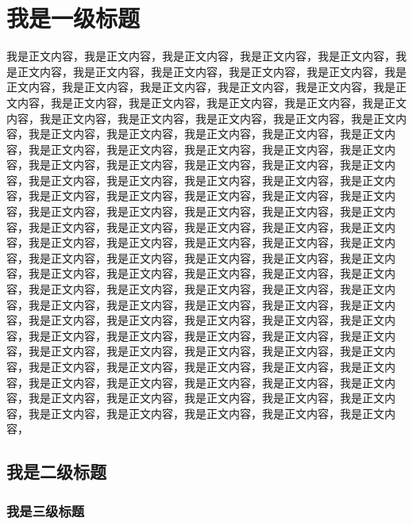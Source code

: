 \chapter{我是一级标题}
我是正文内容，我是正文内容，我是正文内容，我是正文内容，我是正文内容，我是正文内容，我是正文内容，我是正文内容，我是正文内容，我是正文内容，我是正文内容，我是正文内容，我是正文内容，我是正文内容，我是正文内容，我是正文内容，我是正文内容，我是正文内容，我是正文内容，我是正文内容，我是正文内容，我是正文内容，我是正文内容，我是正文内容，我是正文内容，我是正文内容，我是正文内容，我是正文内容，我是正文内容，我是正文内容，我是正文内容，我是正文内容，我是正文内容，我是正文内容，我是正文内容，我是正文内容，我是正文内容，我是正文内容，我是正文内容，我是正文内容，我是正文内容，我是正文内容，我是正文内容，我是正文内容，我是正文内容，我是正文内容，我是正文内容，我是正文内容，我是正文内容，我是正文内容，我是正文内容，我是正文内容，我是正文内容，我是正文内容，我是正文内容，我是正文内容，我是正文内容，我是正文内容，我是正文内容，我是正文内容，我是正文内容，我是正文内容，我是正文内容，我是正文内容，我是正文内容，我是正文内容，我是正文内容，我是正文内容，我是正文内容，我是正文内容，我是正文内容，我是正文内容，我是正文内容，我是正文内容，我是正文内容，我是正文内容，我是正文内容，我是正文内容，我是正文内容，我是正文内容，我是正文内容，我是正文内容，我是正文内容，我是正文内容，我是正文内容，我是正文内容，我是正文内容，我是正文内容，我是正文内容，我是正文内容，我是正文内容，我是正文内容，我是正文内容，我是正文内容，我是正文内容，我是正文内容，我是正文内容，我是正文内容，我是正文内容，我是正文内容，我是正文内容，我是正文内容，我是正文内容，我是正文内容，我是正文内容，我是正文内容，我是正文内容，我是正文内容，我是正文内容，我是正文内容，我是正文内容，我是正文内容，我是正文内容，我是正文内容，我是正文内容，我是正文内容，我是正文内容，我是正文内容，我是正文内容，我是正文内容，我是正文内容，
\section{我是二级标题}
\subsection{我是三级标题}